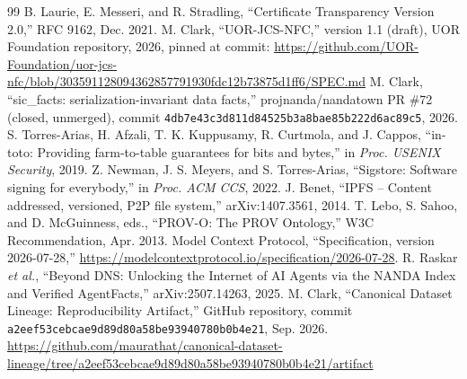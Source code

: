 \documentclass[conference]{IEEEtran}
\begin{document}
\begin{thebibliography}{99}
 B. Laurie, E. Messeri, and R. Stradling, ``Certificate Transparency Version 2.0,'' RFC 9162, Dec. 2021.
 M. Clark, ``UOR-JCS-NFC,'' version 1.1 (draft), UOR Foundation repository, 2026, pinned at commit: \url{https://github.com/UOR-Foundation/uor-jcs-nfc/blob/303591128094362857791930fdc12b73875d1ff6/SPEC.md}
 M. Clark, ``sic\_facts: serialization-invariant data facts,'' projnanda/nandatown PR \#72 (closed, unmerged), commit \texttt{4db7e43c3d811d84525b3a8bae85b222d6ac89c5}, 2026.
 S. Torres-Arias, H. Afzali, T. K. Kuppusamy, R. Curtmola, and J. Cappos, ``in-toto: Providing farm-to-table guarantees for bits and bytes,'' in \emph{Proc. USENIX Security}, 2019.
 Z. Newman, J. S. Meyers, and S. Torres-Arias, ``Sigstore: Software signing for everybody,'' in \emph{Proc. ACM CCS}, 2022.
 J. Benet, ``IPFS -- Content addressed, versioned, P2P file system,'' arXiv:1407.3561, 2014.
 T. Lebo, S. Sahoo, and D. McGuinness, eds., ``PROV-O: The PROV Ontology,'' W3C Recommendation, Apr. 2013.
 Model Context Protocol, ``Specification, version 2026-07-28,'' \url{https://modelcontextprotocol.io/specification/2026-07-28}.
 R. Raskar \emph{et al.}, ``Beyond DNS: Unlocking the Internet of AI Agents via the NANDA Index and Verified AgentFacts,'' arXiv:2507.14263, 2025.
 M. Clark, ``Canonical Dataset Lineage: Reproducibility Artifact,'' GitHub repository, commit \texttt{a2eef53cebcae9d89d80a58be93940780b0b4e21}, Sep. 2026. \url{https://github.com/maurathat/canonical-dataset-lineage/tree/a2eef53cebcae9d89d80a58be93940780b0b4e21/artifact}
\end{thebibliography}
\end{document}
